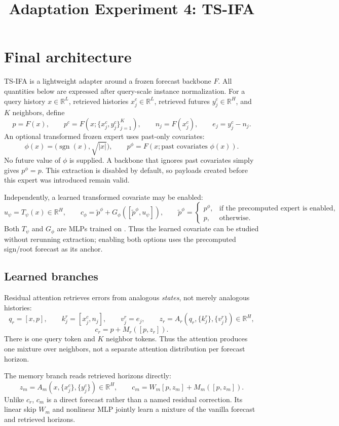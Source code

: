 \documentclass[10pt]{article}
\title{Adaptation Experiment 4: TS-IFA}
\author{}
\date{}
\begin{document}
\maketitle

\section{Final architecture}
TS-IFA is a lightweight adapter around a frozen forecast backbone $F$.  All
quantities below are expressed after query-scale instance normalization.  For a
query history $x\in\mathbb R^L$, retrieved histories
$x^c_j\in\mathbb R^L$, retrieved futures $y^c_j\in\mathbb R^H$, and $K$
neighbors, define
\[
 p=F(x),\qquad p^c=F(x;\{x^c_j,y^c_j\}_{j=1}^K),\qquad
 n_j=F(x^c_j),\qquad e_j=y^c_j-n_j .
\]
An optional transformed frozen expert uses past-only covariates:
\[
 \phi(x)=\bigl(\operatorname{sgn}(x),\sqrt{|x|}\bigr),\qquad
 p^\phi=F(x;\text{past covariates } \phi(x)).
\]
No future value of $\phi$ is supplied.  A backbone that ignores past
covariates simply gives $p^\phi=p$.  This extraction is disabled by default,
so payloads created before this expert was introduced remain valid.

Independently, a learned transformed covariate may be enabled:
\[
 u_\psi=T_\psi(x)\in\mathbb R^H,\qquad
 c_\phi=\widetilde p^\phi+G_\phi([\widetilde p^\phi,u_\psi]),
 \qquad
 \widetilde p^\phi=
 \begin{cases}
 p^\phi,&\text{if the precomputed expert is enabled},\\
 p,&\text{otherwise}.
 \end{cases}
\]
Both $T_\psi$ and $G_\phi$ are MLPs trained on \Tone.  Thus the learned
covariate can be studied without rerunning extraction; enabling both options
uses the precomputed sign/root forecast as its anchor.

\subsection{Learned branches}
Residual attention retrieves errors from analogous \emph{states}, not merely
analogous histories:
\[
 q_r=[x,p],\qquad k^r_j=[x^c_j,n_j],\qquad v^r_j=e_j,
 \qquad
 z_r=A_r(q_r,\{k^r_j\},\{v^r_j\})\in\mathbb R^H,
\]
\[
 c_r=p+M_r([p,z_r]).
\]
There is one query token and $K$ neighbor tokens.  Thus the attention produces
one mixture over neighbors, not a separate attention distribution per forecast
horizon.

The memory branch reads retrieved horizons directly:
\[
 z_m=A_m(x,\{x^c_j\},\{y^c_j\})\in\mathbb R^H,\qquad
 c_m=W_m[p,z_m]+M_m([p,z_m]).
\]
Unlike $c_r$, $c_m$ is a direct forecast rather than a named residual
correction.  Its linear skip $W_m$ and nonlinear MLP jointly learn a mixture of
the vanilla forecast and retrieved horizons.
\end{document}

